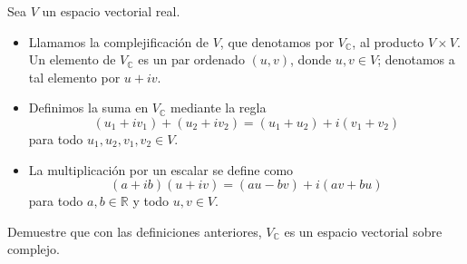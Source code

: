 \documentclass[11pt]{article}
\theoremstyle{definition} %
\begin{document}
Sea \(V\) un espacio vectorial real.

\begin{itemize}
  \item Llamamos la complejificación de \(V\), que denotamos por \(V_{\mathbb C}\), al producto \(V\times V\). Un elemento de \(V_{\mathbb C}\) es un par ordenado \((u,v)\), donde \(u,v\in V\); denotamos a tal elemento por \(u+iv\).
  \item Definimos la suma en \(V_{\mathbb C}\) mediante la regla
  \[
    (u_1+iv_1)+(u_2+iv_2)=(u_1+u_2)+i(v_1+v_2)
  \]
  para todo \(u_1,u_2,v_1,v_2\in V\).
  \item La multiplicación por un escalar se define como
  \[
    (a+ib)(u+iv)=(au-bv)+i(av+bu)
  \]
  para todo \(a,b\in\mathbb{R}\) y todo \(u,v\in V\).
\end{itemize}
Demuestre que con las definiciones anteriores, \(V_{\mathbb C}\) es un espacio vectorial sobre complejo.
\end{document}
